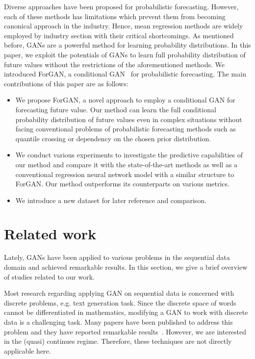 \documentclass{ieeeaccess}
\begin{document}
Diverse approaches have been proposed for probabilistic forecasting. However, each of these methods has limitations which prevent them from becoming canonical approach in the industry. Hence, mean regression methods are widely employed by industry section with their critical shortcomings. As mentioned before, GANs are a powerful method for learning probability distributions. In this paper, we exploit the potentials of GANs to learn full probability distribution of future values without the restrictions of the aforementioned methods. We introduced ForGAN, a conditional GAN~\cite{mirza2014conditional} for probabilistic forecasting. The main contributions of this paper are as follows:
\begin{itemize}
	\item We propose ForGAN, a novel approach to employ a conditional GAN for forecasting future value. Our method can learn the full conditional probability distribution of future values even in complex situations without facing conventional problems of probabilistic forecasting methods such as quantile crossing or dependency on the chosen prior distribution.
	\item We conduct various experiments to investigate the predictive capabilities of our method and compare it with the state-of-the-art methods as well as a conventional regression neural network model with a similar structure to ForGAN. Our method outperforms its counterparts on various metrics.
	\item We introduce a new dataset for later reference and comparison.
\end{itemize}


\section{Related work}
\label{sec:related_work}

Lately, GANs have been applied to various problems in the sequential data domain and achieved remarkable results. In this section, we give a brief overview of studies related to our work.

Most research regarding applying GAN on sequential data is concerned with discrete problems, e.g. text generation task. Since the discrete space of words cannot be differentiated in mathematics, modifying a GAN to work with discrete data is a challenging task. Many papers have been published to address this problem and they have reported remarkable results~\cite{press2017language,li2017adversarial,yu2017seqgan,zhang2016generating}. However, we are interested in the (quasi) continues regime. Therefore, these techniques are not directly applicable here.
\end{document}
